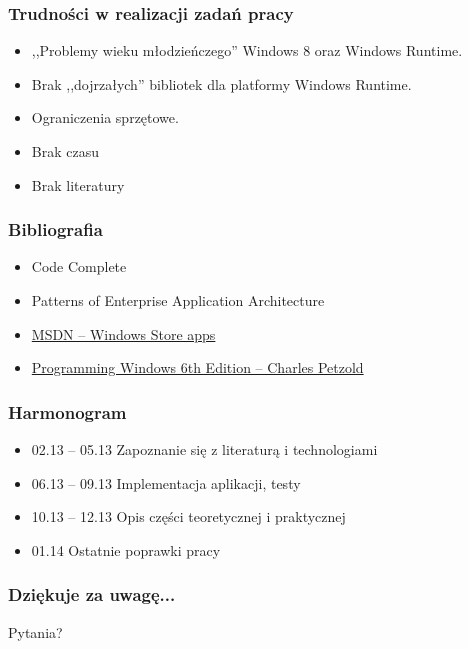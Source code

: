 \documentclass{beamer}
\begin{document}
\begin{frame}
\frametitle{Trudności w realizacji zadań pracy}

\begin{itemize}
\item ,,Problemy wieku młodzieńczego'' Windows 8 oraz Windows Runtime.
\item Brak ,,dojrzałych'' bibliotek dla platformy Windows Runtime.
\item Ograniczenia sprzętowe.
\item Brak czasu
\item Brak literatury
\end{itemize}
\end{frame}


\begin{frame}
\frametitle{Bibliografia} 
\begin{itemize}
\item Code Complete 
\item Patterns of Enterprise Application Architecture
\item \href{http://msdn.microsoft.com/en-us/windows/apps/}{MSDN -- Windows Store apps}
\item \href{http://www.charlespetzold.com/blog/2013/01/Programming-Windows-6th-Edition-Final-Ebook-Now-Available.html}{Programming Windows 6th Edition -- Charles Petzold}
\end{itemize}
\end{frame}


\begin{frame}
\frametitle{Harmonogram} 
\begin{itemize}

\item 02.13 – 05.13 Zapoznanie się z literaturą i technologiami
\item 06.13 – 09.13 Implementacja aplikacji, testy
\item 10.13 – 12.13 Opis części teoretycznej i praktycznej
\item 01.14 Ostatnie poprawki pracy

\end{itemize}
\end{frame}


\begin{frame}
\frametitle{Dziękuje za uwagę...}
Pytania?

\end{frame}
\end{document}
